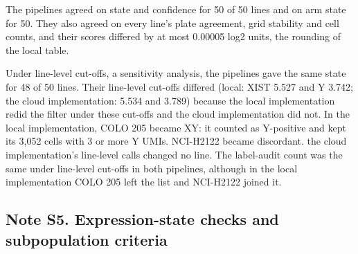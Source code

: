 \documentclass[
  11pt,
  letterpaper,
]{article}
\begin{document}
The pipelines agreed on state and confidence for 50 of 50 lines and on
arm state for 50. They also agreed on every line's plate agreement, grid
stability and cell counts, and their scores differed by at most 0.00005
log2 units, the rounding of the local table.

Under line-level cut-offs, a sensitivity analysis, the pipelines gave
the same state for 48 of 50 lines. Their line-level cut-offs differed
(local: XIST 5.527 and Y 3.742; the cloud implementation: 5.534 and
3.789) because the local implementation redid the filter under these
cut-offs and the cloud implementation did not. In the local
implementation, COLO 205 became XY: it counted as Y-positive and kept
its 3,052 cells with 3 or more Y UMIs. NCI-H2122 became discordant. the
cloud implementation's line-level calls changed no line. The label-audit
count was the same under line-level cut-offs in both pipelines, although
in the local implementation COLO 205 left the list and NCI-H2122 joined
it.

\subsection{Note S5. Expression-state checks and subpopulation
criteria}\label{note-s5.-expression-state-checks-and-subpopulation-criteria}
\end{document}
